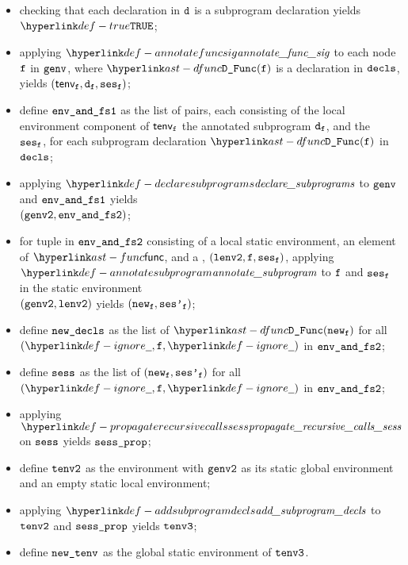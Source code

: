 \ProseParagraph
\AllApply
\begin{itemize}
  \item checking that each declaration in $\texttt{d}$ is a subprogram declaration yields $\True$\ProseTerminateAs{\BadDeclaration};
  \item applying $\annotatefuncsig$ to each node $\texttt{f}$ in $\texttt{genv}$, where $\DFunc(\vf)$ is a declaration in $\texttt{decls}$,
        yields $(\textsf{tenv}_{\texttt{f}}, \texttt{d}_{\texttt{f}}, \texttt{ses}_{\texttt{f}})$\ProseOrTypeError;
  \item define $\texttt{env\_and\_fs1}$ as the list of pairs, each consisting of the local environment component of $\textsf{tenv}_{\texttt{f}}$
        the annotated subprogram $\texttt{d}_{\texttt{f}}$, and the \sideeffectsetterm\ $\texttt{ses}_{\texttt{f}}$, for each subprogram declaration $\DFunc(\vf)$ in $\texttt{decls}$;
  \item applying $\declaresubprograms$ to $\texttt{genv}$ and $\texttt{env\_and\_fs1}$ yields \\
        $(\texttt{genv2}, \texttt{env\_and\_fs2})$\ProseOrTypeError;
  \item for tuple in $\texttt{env\_and\_fs2}$ consisting of a local static environment, an element of $\func$,
        and a \sideeffectsetterm, $(\texttt{lenv2}, \texttt{f}, \texttt{ses}_{\texttt{f}})$,
        applying $\annotatesubprogram$ to $\texttt{f}$ and $\texttt{ses}_{\texttt{f}}$ in the static environment \\
        $(\texttt{genv2}, \texttt{lenv2})$ yields $(\texttt{new}_{\texttt{f}}, \texttt{ses'}_{\texttt{f}})$\ProseOrTypeError;
  \item define $\texttt{new\_decls}$ as the list of $\DFunc(\vnew_\vf)$ for all $(\Ignore, \vf, \Ignore)$ in $\texttt{env\_and\_fs2}$;
  \item define $\texttt{sess}$ as the list of $(\texttt{new}_{\texttt{f}}, \texttt{ses'}_{\texttt{f}})$ for all $(\Ignore, \vf, \Ignore)$ in $\texttt{env\_and\_fs2}$;
  \item applying $\propagaterecursivecallssess$ on $\texttt{sess}$ yields $\texttt{sess\_prop}$;
  \item define $\texttt{tenv2}$ as the environment with $\texttt{genv2}$ as its static global environment
        and an empty static local environment;
  \item applying $\addsubprogramdecls$ to $\texttt{tenv2}$ and $\texttt{sess\_prop}$ yields $\texttt{tenv3}$;
  \item define $\texttt{new\_tenv}$ as the global static environment of $\texttt{tenv3}$.
\end{itemize}

